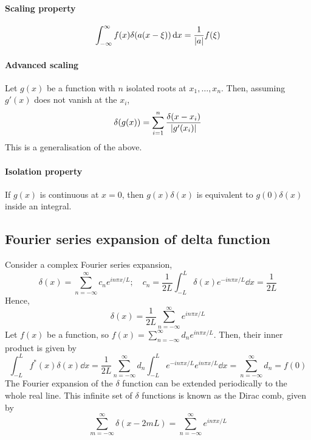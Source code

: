\documentclass[a4paper]{article}
\begin{document}
\paragraph{Scaling property}
\[
	\int_{-\infty}^\infty f(x) \delta(a(x-\xi)) \,\mathrm{d}{x} = \frac{1}{\abs{a}}f(\xi)
\]

\paragraph{Advanced scaling} Let \( g(x) \) be a function with \( n \) isolated roots at \( x_1, \dots, x_n \).
Then, assuming \( g'(x) \) does not vanish at the \( x_i \),
\[
	\delta(g(x)) = \sum_{i=1}^n \frac{\delta(x - x_i)}{\abs{g'(x_i)}}
\]
This is a generalisation of the above.

\paragraph{Isolation property}
If \( g(x) \) is continuous at \( x = 0 \), then \( g(x) \delta(x) \) is equivalent to \( g(0) \delta(x) \) inside an integral.

\subsection{Fourier series expansion of delta function}

Consider a complex Fourier series expansion,
\[
	\delta(x) = \sum_{n=-\infty}^\infty c_n e^{in\pi x/L};\quad c_n = \frac{1}{2L}\int_{-L}^L \delta(x) e^{-i n \pi x / L} \dd{x} = \frac{1}{2L}
\]
Hence,
\[
	\delta(x) = \frac{1}{2L} \sum_{n=-\infty}^\infty e^{in\pi x/L}
\]
Let \( f(x) \) be a function, so \( f(x) = \sum_{n=-\infty}^\infty d_n e^{in \pi x / L} \).
Then, their inner product is given by
\[
	\int_{-L}^L f^*(x) \delta(x) \dd{x} = \frac{1}{2L} \sum_{n = -\infty}^\infty d_n \int_{-L}^L e^{-in \pi x/L} e^{in \pi x/L} \dd{x} = \sum_{n = -\infty}^\infty d_n = f(0)
\]
The Fourier expansion of the \( \delta \) function can be extended periodically to the whole real line.
This infinite set of \( \delta \) functions is known as the Dirac comb, given by
\[
	\sum_{m = -\infty}^\infty \delta(x-2mL) = \sum_{n = -\infty}^\infty e^{in \pi x/L}
\]
\end{document}
